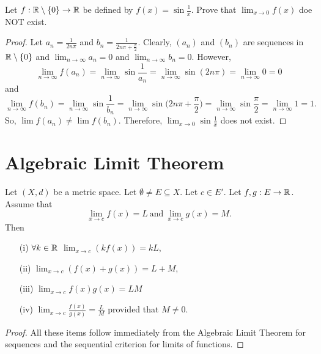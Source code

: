 \documentclass[a4paper]{article}
\begin{document}
\begin{eg}
    Let \( f: \mathbb{R} \setminus \{  0 \} \to \mathbb{R}  \) be defined by \( f(x) = \sin \frac{ 1 }{ x }  \). Prove that \( \lim_{ x \to 0 } f(x) \) doe NOT exist.
\end{eg}
\begin{proof}
Let \( {a}_{n} = \frac{ 1 }{ 2n \pi }  \) and \( {b}_{n} = \frac{ 1 }{ 2n \pi + \frac{ \pi }{ 2 }  }  \). Clearly, \( ({a}_{n}) \) and \( ({b}_{n}) \) are sequences in \( \mathbb{R} \setminus \{ 0 \}  \) and \( \lim_{ n \to \infty  }  {a}_{n} = 0  \) and \( \lim_{ n \to \infty  }  {b}_{n} = 0 \). However,
\[ \lim_{ n \to \infty  }  f({a}_{n}) = \lim_{ n \to \infty  }  \sin \frac{ 1 }{ {a}_{n} }  = \lim_{ n \to \infty  }  \sin (2n \pi) = \lim_{ n \to \infty  } 0 = 0   \]
and
\[  \lim_{ n \to \infty  } f({b}_{n}) = \lim_{ n \to \infty  } \sin \frac{ 1 }{ {b}_{n} } = \lim_{ n \to \infty  }  \sin \Big(2n\pi + \frac{ \pi }{ 2 }  \Big) = \lim_{ n \to \infty  }  \sin \frac{ \pi }{ 2 }  = \lim_{ n \to \infty  } 1 = 1. \]
So, \( \lim f({a}_{n}) \neq \lim f({b}_{n}) \). Therefore, \( \lim_{ x \to 0 }  \sin \frac{ 1 }{ x }  \) does not exist.
\end{proof}

\section{Algebraic Limit Theorem}\label{Algebraic Limit Theorem}

\begin{theorem}
    Let \( (X,d) \) be a metric space. Let \( \emptyset \neq E \subseteq  X \). Let \( c \in E' \). Let \( f,g: E \to \mathbb{R}  \). Assume that 
    \[  \lim_{ x \to c } f(x) = L \ \text{and} \ \lim_{ x \to c }  g(x) = M. \]
    Then
    \begin{enumerate}
        \item[(i)] \( \forall k \in \mathbb{R}  \) \( \lim_{ x \to c } (kf(x)) =  kL \),
        \item[(ii)] \( \lim_{ x \to c } (f(x) + g(x))  = L + M\),
        \item[(iii)] \( \lim_{ x \to c } f(x)g(x) = LM \)
        \item[(iv)] \( \lim_{ x \to c } \frac{ f(x) }{ g(x) }  = \frac{ L }{ M }  \) provided that \( M \neq 0 \).
    \end{enumerate}
\end{theorem}
\begin{proof}
All these items follow immediately from the Algebraic Limit Theorem for sequences and the sequential criterion for limits of functions.
\end{proof}
\end{document}
